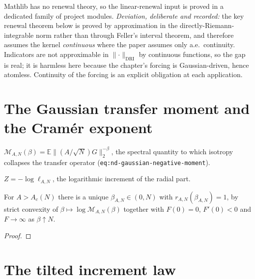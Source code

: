 Mathlib has no renewal theory, so the linear-renewal input is proved in a
dedicated family of project modules. \emph{Deviation, deliberate and recorded:} the key
renewal theorem below is proved by approximation in the directly-Riemann-integrable
norm rather than through Feller's interval theorem, and therefore assumes the
kernel \emph{continuous} where the paper assumes only a.e.\ continuity.  Indicators
are not approximable in $\lVert\cdot\rVert_{\mathrm{DRI}}$ by continuous functions,
so the gap is real; it is harmless here because the chapter's forcing is
Gaussian-driven, hence atomless.  Continuity of the forcing is an explicit
obligation at each application.

\section{The Gaussian transfer moment and the Cram\'er exponent}

\begin{definition}
  \label{def:nd-gaussian-transfer-moment}
  \leanok
  $\mathcal M_{A,N}(\beta) = \mathbb E\lVert (A/\sqrt N)G\rVert_2^{-\beta}$, the
  spectral quantity to which isotropy collapses the transfer operator
  (\texttt{eq:nd-gaussian-negative-moment}).
\end{definition}

\begin{definition}
  \label{def:nd-log-radial-increment}
  \leanok
  $Z = -\log\ell_{A,N}$, the logarithmic increment of the radial part.
\end{definition}

\begin{lemma}
  \label{lem:nd-gaussian-cramer-exponent}
  \leanok
  For $A>A_c(N)$ there is a unique $\beta_{A,N}\in(0,N)$ with
  $r_{A,N}(\beta_{A,N})=1$, by strict convexity of $\beta\mapsto\log\mathcal
  M_{A,N}(\beta)$ together with $F(0)=0$, $F'(0)<0$ and $F\to\infty$ as
  $\beta\uparrow N$.
\end{lemma}
\begin{proof}\leanok\end{proof}

\section{The tilted increment law}

